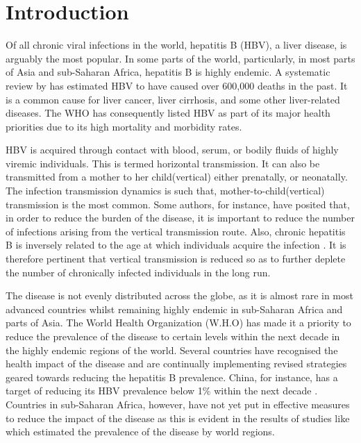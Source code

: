 \chapter{Introduction}
\label{chp:Intro}
Of all chronic viral infections in the world, hepatitis B (HBV), a liver disease, is arguably the most popular. 
In some parts of the world, particularly, in most parts of Asia and sub-Saharan Africa, hepatitis B is highly endemic. A systematic review by \cite{ott2012GlobalEpidemiology} has estimated HBV to have caused over 600,000 deaths in the past. It is a common cause for liver cancer, liver cirrhosis, and some other liver-related diseases. The WHO has consequently listed HBV as part of its major health priorities due to its high mortality and morbidity rates.

HBV is acquired  through contact with blood, serum, or bodily fluids of highly viremic individuals. This is termed horizontal transmission. It can also be transmitted from a mother to her child(vertical) either prenatally, or neonatally. The infection transmission dynamics is such that, mother-to-child(vertical) transmission is the most common\cite{tran2009management}. Some authors, for instance, \cite{tran2009management,andersson2015mother} have posited that, in order to reduce the burden of the disease, it is important to reduce the number of infections arising from the vertical transmission route. Also,  chronic hepatitis B is inversely related to the age at which individuals acquire the infection\cite{tran2009management} . It is therefore pertinent that vertical transmission is reduced so as to further deplete the number of chronically infected individuals in the long run. 

The disease is not evenly distributed across the globe, as it is almost rare in most advanced countries whilst remaining highly endemic in sub-Saharan Africa and parts of Asia\cite{medley2001hepatitis}. The World Health Organization (W.H.O) has made it a priority to reduce the prevalence of the disease to certain levels within the next decade in the highly endemic regions of the world. Several countries have recognised the health impact of the disease and are continually implementing revised strategies geared towards reducing the hepatitis B prevalence. China, for instance, has a target of reducing its HBV prevalence below 1\% within the next decade \cite{pang2010DynamicalBehaviour}. Countries in sub-Saharan Africa, however, have not yet put in effective measures to reduce the impact of the disease as this is evident in the results of studies like \cite{ott2012GlobalEpidemiology} which estimated the prevalence of the disease by world regions. 

